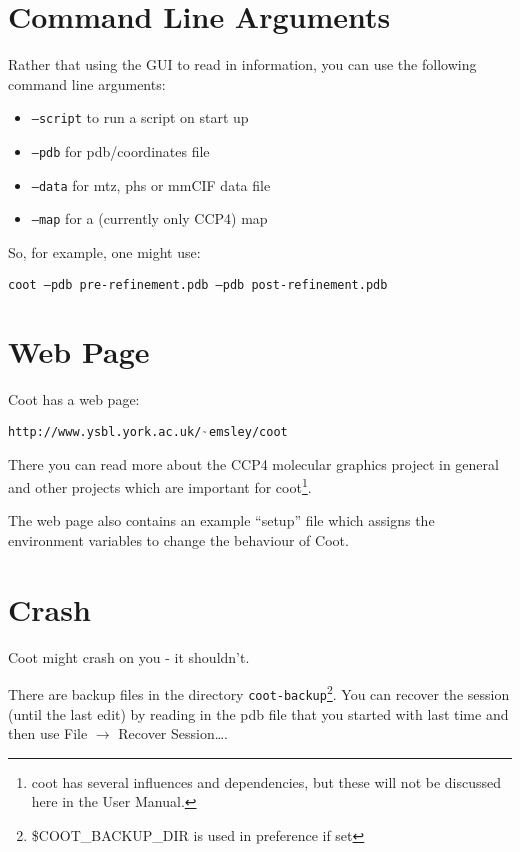 \documentclass{book}
\newcommand {\atilde} {$_{\char '176}$} %
\begin{document}
\section{Command Line Arguments}
\label{sec:command_line_arguments}
Rather that using the GUI to read in information, you can use the
following command line arguments:
\begin{itemize}
\item \texttt{--script} to run a script on start up
\item \texttt{--pdb}  for pdb/coordinates file
\item \texttt{--data} for mtz, phs or mmCIF data file
\item \texttt{--map}  for a (currently only CCP4) map
\end{itemize}
So, for example, one might use: 
\begin{trivlist}
\item \texttt{coot --pdb pre-refinement.pdb --pdb post-refinement.pdb}
\end{trivlist}

\section{Web Page}
\label{webpage}
Coot has a web page:

\begin{trivlist}
\item \texttt{http://www.ysbl.york.ac.uk/\atilde emsley/coot}
\end{trivlist}

There you can read more about the CCP4 molecular graphics project in
general and other projects which are important for coot\footnote{coot
  has several influences and dependencies, but these will not be
  discussed here in the User Manual.}.

The web page also contains an example ``setup'' file which assigns the
environment variables to change the behaviour of Coot.

\section{Crash}
\label{sec:crash}
Coot might crash on you - it shouldn't.  

There are backup files in
the directory \texttt{coot-backup}\footnote{\$COOT\_BACKUP\_DIR is used
  in preference if set}. You can recover the session (until the last
edit) by reading in the pdb file that you started with last time and
then use \textsf{File $\rightarrow$ Recover Session\ldots}.
\end{document}
